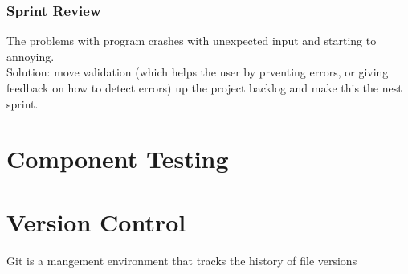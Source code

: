 \documentclass[a4paper,12pt]{article}
\begin{document}
\subsubsection{Sprint Review}
The problems with program crashes with unexpected input and starting to annoying. \\
Solution: move validation (which helps the user by prventing errors, or giving feedback on how to detect errors) up the project backlog and make this the nest sprint.
\section{Component Testing}
\section{Version Control}
Git is a mangement environment that tracks the history of file versions 






	
	
	
	
	
	
	
	
	
	
	
\end{document}
